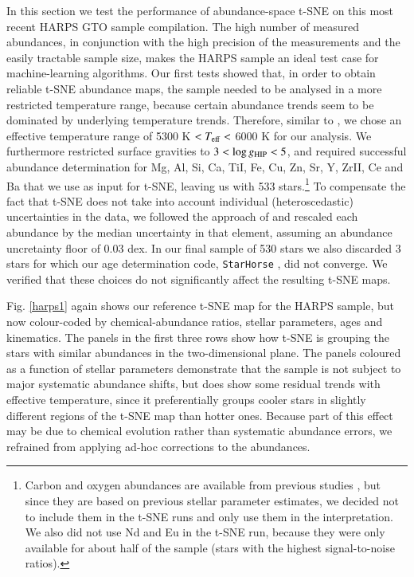 \documentclass{aa}  %
\begin{document}
In this section we test the performance of abundance-space t-SNE on this most recent HARPS GTO sample compilation. The high number of measured abundances, in conjunction with the high precision of the measurements and the easily tractable sample size, makes the HARPS sample an ideal test case for machine-learning algorithms. 
Our first tests showed that, in order to obtain reliable t-SNE abundance maps, the sample needed to be analysed in a more restricted temperature range, because certain abundance trends seem to be dominated by underlying temperature trends. Therefore, similar to \citet{DelgadoMena2017}, we chose an effective temperature range of 5300 K $<T_{\rm eff}<$ 6000 K for our analysis. We furthermore restricted surface gravities to $3<\log g_{\rm HIP}<5$, and required successful abundance determination for Mg, Al, Si, Ca, TiI, Fe, Cu, Zn, Sr, Y, ZrII, Ce and Ba that we use as input for t-SNE, leaving us with 533 stars.\footnote{Carbon and oxygen abundances are available from previous studies \citep{Suarez-Andres2017, BertrandeLis2015}, but since they are based on previous stellar parameter estimates, we decided not to include them in the t-SNE runs and only use them in the interpretation. We also did not use Nd and Eu in the t-SNE run, because they were only available for about half of the sample (stars with the highest signal-to-noise ratios).} To compensate the fact that t-SNE does not take into account individual (heteroscedastic) uncertainties in the data, we followed the approach of \citet{Hogg2016} and rescaled each abundance by the median uncertainty in that element, assuming an abundance uncretainty floor of 0.03 dex. In our final sample of 530 stars we also discarded 3 stars for which our age determination code, {\tt StarHorse} \citep{Santiago2016, Queiroz2018}, did not converge. We verified that these choices do not significantly affect the resulting t-SNE maps. 

Fig. \ref{harps1} again shows our reference t-SNE map for the HARPS sample, but now colour-coded by chemical-abundance ratios, stellar parameters, ages and kinematics. The panels in the first three rows show how t-SNE is grouping the stars with similar abundances in the two-dimensional plane. The panels coloured as a function of stellar parameters demonstrate that the sample is not subject to major systematic abundance shifts, but does show some residual trends with effective temperature, since it preferentially groups cooler stars in slightly different regions of the t-SNE map than hotter ones. Because part of this effect may be due to chemical evolution rather than systematic abundance errors, we refrained from applying ad-hoc corrections to the abundances. 
\end{document}
